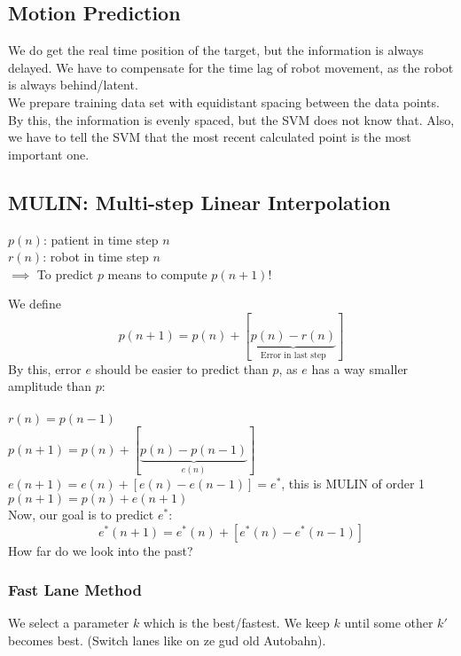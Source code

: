 \documentclass{exerciseBlue}
\begin{document}
\subsection{Motion Prediction}
We do get the real time position of the target, but the information is always delayed. We have to compensate for the time lag of robot movement, as the robot is always behind/latent.\\
We prepare training data set with equidistant spacing between the data points. By this, the information is evenly spaced, but the SVM does not know that. Also, we have to tell the SVM that the most recent calculated point is the most important one.
\subsection{MULIN: Multi-step Linear Interpolation}
$p(n)$: patient in time step $n$\\
$r(n)$: robot in time step $n$\\
$\implies $ To predict $p$ means to compute $p(n+1)$!\\
\par We define
$$p(n+1) = p(n) + [\underbrace{p(n)-r(n)}_{\text{Error in last step}}]$$
By this, error $e$ should be easier to predict than $p$, as $e$ has a way smaller amplitude than $p$:\\\\
$r(n) = p(n-1)$\\
$p(n+1) = p(n) + [\underbrace{p(n)-p(n-1)}_{e(n)}]$\\
$e(n+1) = e(n)+[e(n)-e(n-1)] = e^*$, this is MULIN of order 1\\
$p(n+1)=p(n)+e(n+1)$\\
Now, our goal is to predict $e^*$:
$$e^*(n+1) = e^*(n)+[e^*(n)-e^*(n-1)]$$
How far do we look into the past?
\subsubsection{Fast Lane Method}
We select a parameter $k$ which is the best/fastest. We keep $k$ until some other $k'$ becomes best. (Switch lanes like on ze gud old Autobahn).
\end{document}
